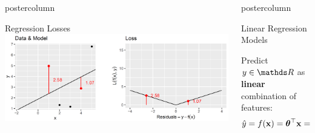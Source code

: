 \documentclass{beamer}
\newlength{\columnheight} %
\begin{document}
\begin{frame}[fragile]{}
\begin{columns}
\begin{column}{.31\textwidth}
\begin{beamercolorbox}[center]{postercolumn}
\begin{minipage}{.98\textwidth}
{\begin{myblock}{Regression Losses}
\includegraphics[width=0.8\columnwidth]{img/reg_loss_2.PNG} 

      \end{myblock}

  }
			\end{minipage}
		\end{beamercolorbox}
	\end{column}


\begin{column}{.31\textwidth}
\begin{beamercolorbox}[center]{postercolumn}
\begin{minipage}{.98\textwidth}
\parbox[t][\columnheight]{\textwidth}{

\begin{myblock}
  {Linear Regression Models}

  Predict $y \in \R$ as \textbf{linear} combination of features:
  $$\hat{y} = f(\mathbf{x}) = \bm{\theta}^\top \mathbf{x} = \theta_0 + \theta_1 x_1 + \dots + \theta_p x_p.$$
    

\end{myblock}}
\end{minipage}
\end{beamercolorbox}
\end{column}
\end{columns}
\end{frame}
\end{document}
